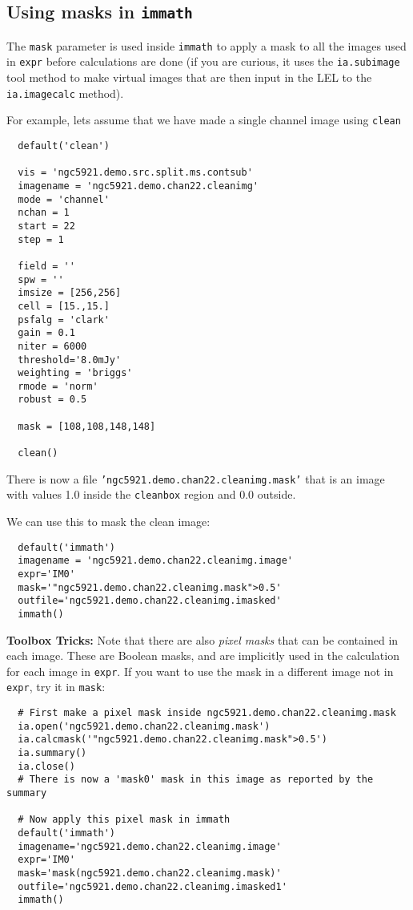 \subsection{Using masks in {\tt immath}}
\label{section:analysis.immath.masks}

The {\tt mask} parameter is used inside {\tt immath} to apply a
mask to all the images used in {\tt expr} before calculations
are done (if you are curious, it uses the {\tt ia.subimage} tool
method to make virtual images that are then input in the LEL to the 
{\tt ia.imagecalc} method).

For example, lets assume that we have made a single channel image
using {\tt clean}
\small
\begin{verbatim}
  default('clean')
  
  vis = 'ngc5921.demo.src.split.ms.contsub'
  imagename = 'ngc5921.demo.chan22.cleanimg'
  mode = 'channel'
  nchan = 1
  start = 22
  step = 1
  
  field = ''
  spw = ''
  imsize = [256,256]
  cell = [15.,15.]
  psfalg = 'clark'
  gain = 0.1
  niter = 6000
  threshold='8.0mJy'
  weighting = 'briggs'
  rmode = 'norm'
  robust = 0.5
  
  mask = [108,108,148,148]
  
  clean()
\end{verbatim}
\normalsize
There is now a file {\tt 'ngc5921.demo.chan22.cleanimg.mask'} that is
an image with values 1.0 inside the {\tt cleanbox} region and 0.0
outside.  

We can use this to mask the clean image:
\small
\begin{verbatim}
  default('immath')
  imagename = 'ngc5921.demo.chan22.cleanimg.image'
  expr='IM0'
  mask='"ngc5921.demo.chan22.cleanimg.mask">0.5'
  outfile='ngc5921.demo.chan22.cleanimg.imasked'
  immath()
\end{verbatim}
\normalsize

{\bf Toolbox Tricks:}
Note that there are also {\it pixel masks} that can be contained in each
image.  These are Boolean masks, and are implicitly used in the
calculation for each image in {\tt expr}.  If you want to use the
mask in a different image not in {\tt expr}, try it in {\tt mask}:
\small
\begin{verbatim}
  # First make a pixel mask inside ngc5921.demo.chan22.cleanimg.mask
  ia.open('ngc5921.demo.chan22.cleanimg.mask')
  ia.calcmask('"ngc5921.demo.chan22.cleanimg.mask">0.5')
  ia.summary()
  ia.close()
  # There is now a 'mask0' mask in this image as reported by the summary

  # Now apply this pixel mask in immath
  default('immath')
  imagename='ngc5921.demo.chan22.cleanimg.image'
  expr='IM0'
  mask='mask(ngc5921.demo.chan22.cleanimg.mask)'
  outfile='ngc5921.demo.chan22.cleanimg.imasked1'
  immath()
\end{verbatim}
\normalsize

